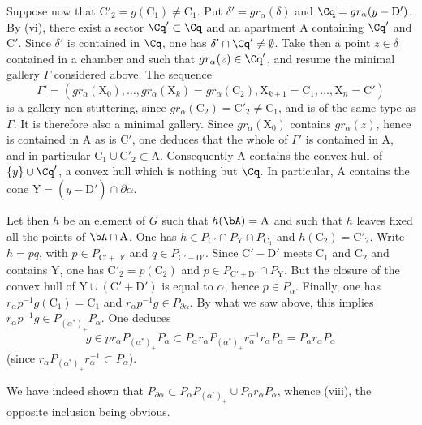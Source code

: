 \documentclass[12pt,a4paper,oneside,english]{smfart}
\makeatletter
\newcommand{\btpageanchor}[1]{\Hy@raisedlink{\hypertarget{p:#1}{}}}
\newcommand{\btpage}[1]{\marginnote{p.~#1}\btpageanchor{#1}}
\newcommand{\pg}[1]{\btpage{#1}}
\theoremstyle{definition}
\theoremstyle{bt}
\makeatother
\begin{document}
Suppose now that $\mathrm{C}'_{2}=g(\mathrm{C}_{1})\neq \mathrm{C}_{1}$. Put
$\delta'=gr_{\alpha}(\delta)$ and $\Cq=gr_{\alpha}(y-\mathrm{D}')$. By (vi),
there exist a sector $\Cq'\subset\Cq$ and an apartment $\mathrm{A}$ containing
$\Cq'$ and $\mathrm{C}'$. Since $\delta'$ is contained in $\Cq$, one has
$\delta'\cap\Cq'\neq\emptyset$. Take then a point $z\in\delta$ contained in a
chamber and such that $gr_{\alpha}(z)\in\Cq'$, and resume the minimal gallery
$\Gamma$ considered above. The sequence
\[
\Gamma'=(gr_{\alpha}(\mathrm{X}_{0}),\dots,gr_{\alpha}(\mathrm{X}_{k})=gr_{\alpha}(\mathrm{C}_{2}),
\mathrm{X}_{k+1}=\mathrm{C}_{1},\dots,\mathrm{X}_{n}=\mathrm{C}')
\]
is a gallery non-stuttering, since
$gr_{\alpha}(\mathrm{C}_{2})=\mathrm{C}'_{2}\neq \mathrm{C}_{1}$, and is of the
same type as $\Gamma$. It is therefore also a minimal gallery. Since
$gr_{\alpha}(\mathrm{X}_{0})$ contains $gr_{\alpha}(z)$, hence is contained in
$\mathrm{A}$ as is $\mathrm{C}'$, one deduces that the whole of $\Gamma'$ is
contained in $\mathrm{A}$, and in particular
$\mathrm{C}_{1}\cup \mathrm{C}'_{2}\subset \mathrm{A}$. Consequently
$\mathrm{A}$ contains the convex hull of $\{y\}\cup\Cq'$, a convex hull which is
nothing but $\Cq$. In particular, $\mathrm{A}$ contains the cone
$\mathrm{Y}=(y-\overline{\mathrm{D}'})\cap\partial\alpha$.

Let then $h$ be an element of $G$ such that $h(\bA)=\mathrm{A}$ and such that
$h$ leaves fixed all the points of $\bA\cap \mathrm{A}$. One has
$h\in P_{\mathrm{C}'}\cap P_{\mathrm{Y}}\cap P_{\mathrm{C}_{1}}$ and
$h(\mathrm{C}_{2})=\mathrm{C}'_{2}$. Write $h=pq$, with
$p\in P_{\mathrm{C}'+\mathrm{D}'}$ and $q\in P_{\mathrm{C}'-\mathrm{D}'}$. Since
$\mathrm{C}'-\overline{\mathrm{D}'}$ meets $\mathrm{C}_{1}$ and
$\mathrm{C}_{2}$ and contains $\mathrm{Y}$, one has
$\mathrm{C}'_{2}=p(\mathrm{C}_{2})$ and
$p\in P_{\mathrm{C}'+\mathrm{D}'}\cap P_{\mathrm{Y}}$. But the closure of the
convex hull of $\mathrm{Y}\cup(\mathrm{C}'+\mathrm{D}')$ is equal to $\alpha$,
hence $p\in P_{\alpha}$. Finally, one has
$r_{\alpha}p^{-1}g(\mathrm{C}_{1})=\mathrm{C}_{1}$ and
$r_{\alpha}p^{-1}g\in P_{\partial\alpha}$. By what we saw above, this implies
$r_{\alpha}p^{-1}g\in P_{(\alpha^{*})_{+}}P_{\alpha}$. One deduces
\[
g\in pr_{\alpha}P_{(\alpha^{*})_{+}}P_{\alpha}
\subset P_{\alpha}r_{\alpha}P_{(\alpha^{*})_{+}}r_{\alpha}^{-1}r_{\alpha}P_{\alpha}
=P_{\alpha}r_{\alpha}P_{\alpha}
\]
(since $r_{\alpha}P_{(\alpha^{*})_{+}}r_{\alpha}^{-1}\subset P_{\alpha}$).

\pg{90}
We have indeed shown that
$P_{\partial\alpha}\subset P_{\alpha}P_{(\alpha^{*})_{+}}\cup P_{\alpha}r_{\alpha}P_{\alpha}$,
whence (viii), the opposite inclusion being obvious.
\end{document}
